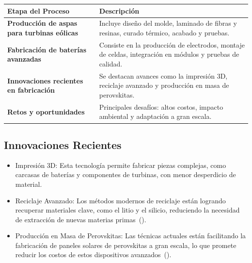 \documentclass[letterpaper, 12pt]{article}
\begin{document}
\begin{table}[H]
      \begin{tabularx}{\linewidth}{>{\arraybackslash}X>{\arraybackslash}X}
            \hline
            \textbf{Etapa del Proceso}      & \textbf{Descripción}                                    \\\hline
            \textbf{Producción de aspas para
            turbinas eólicas}               & Incluye diseño del molde, laminado de fibras y resinas,
            curado térmico, acabado y pruebas.                                                        \\\hline
            \textbf{Fabricación de baterías
            avanzadas}                      & Consiste en la producción de electrodos, montaje de
            celdas, integración en módulos y pruebas de calidad.                                      \\\hline
            \textbf{Innovaciones recientes en
            fabricación }                   & Se destacan avances como la impresión 3D, reciclaje
            avanzado y producción en masa de perovskitas.                                             \\\hline
            \textbf{Retos y oportunidades } & Principales desafíos: altos costos, impacto ambiental y
            adaptación a gran escala.                                                                 \\\hline
      \end{tabularx}
\end{table}

\subsection{Innovaciones Recientes}

\begin{itemize}
      \item Impresión 3D: Esta tecnología permite fabricar piezas complejas, como carcasas
            de baterías y componentes de turbinas, con menor desperdicio de material.

      \item Reciclaje Avanzado: Los métodos modernos de reciclaje están logrando recuperar
            materiales clave, como el litio y el silicio, reduciendo la necesidad de
            extracción de nuevas materias primas~(\cite{Galembeck2019}).

      \item Producción en Masa de Perovskitas: Las técnicas actuales están facilitando la
            fabricación de paneles solares de perovskitas a gran escala, lo que promete
            reducir los costos de estos dispositivos avanzados~(\cite{Uyor2021}).
\end{itemize}
\end{document}
